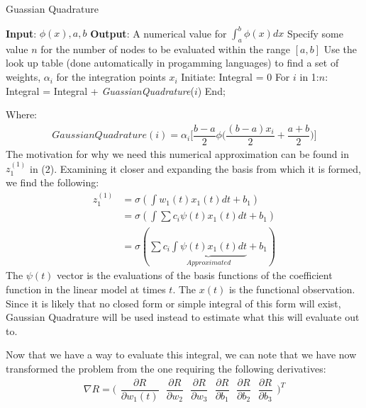 \documentclass{article}
\begin{document}
\begin{algorithm}[H]
\caption{Guassian Quadrature}\label{alg:quad}
\begin{algorithmic}[1]
\Statex \textbf{Input}: $\phi(x), a, b$
\Statex \textbf{Output}: A numerical value for $\int_{a}^{b}\phi(x)dx$ 
\State Specify some value $n$ for the number of nodes to be evaluated within the range $[a, b]$
\State Use the look up table (done automatically in progamming languages) to find a set of weights, $\alpha_{i}$ for the integration points $x_i$
\State Initiate: Integral = 0
\Statex \hspace{1em} For $i$ in 1:$n$: Integral = Integral + \textit{GuassianQuadrature}($i$)
\Statex End;

\end{algorithmic}
\end{algorithm}

\noindent Where:
\begin{align}
GaussianQuadrature(i) = \alpha_{i}\Bigg[\dfrac{b - a}{2} \phi\Bigg(\dfrac{(b - a)x_{i}}{2} + \dfrac{a + b}{2}\Bigg)\Bigg]
\end{align}
\noindent The motivation for why we need this numerical approximation can be found in $z_{1}^{(1)}$ in (2). Examining it closer and expanding the basis from which it is formed, we find the following:
\begin{align}
    z_{1}^{(1)} &= \sigma(\int w_{1}(t)x_{1}(t)dt + b_{1})\\
    &= \sigma(\int \sum c_{i}\psi(t)x_{1}(t)dt + b_{1})\\
    &= \sigma(\sum c_{i}\underbrace{\int\psi(t)x_{1}(t)dt}_{Approximated} + b_{1})
\end{align}
\noindent The $\psi(t)$ vector is the evaluations of the basis functions of the coefficient function in the linear model at times $t$. The $x(t)$ is the functional observation. Since it is likely that no closed form or simple integral of this form will exist, Gaussian Quadrature will be used instead to estimate what this will evaluate out to. 

\noindent Now that we have a way to evaluate this integral, we can note that we have now transformed the problem from the one requiring the following derivatives:
\[\nabla R = \Bigg( \begin{array}{cc}

\dfrac{\partial R}{\partial w_{1}(t)} \ \ \
\dfrac{\partial R}{\partial w_{2}} \ \ \
\dfrac{\partial R}{\partial w_{3}} \ \ \
\dfrac{\partial R}{\partial b_{1}} \ \ \ 
\dfrac{\partial R}{\partial b_{2}} \ \ \
\dfrac{\partial R}{\partial b_{3}}
\end{array} \Bigg)^{T}\] 
\end{document}
